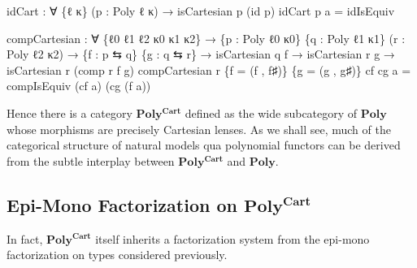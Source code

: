 \documentclass[
  11pt,
  oneside,
  article]{memoir}
\newenvironment{Shaded}{}{}
\newcommand{\NormalTok}[1]{#1}
\newcommand{\OtherTok}[1]{\textcolor[rgb]{0.00,0.44,0.13}{#1}}
\theoremstyle{definition}
\theoremstyle{plain}
\newcommand{\0}{\textsf{0}}
\newcommand{\1}{\tn{\textsf{1}}}
\begin{document}
\begin{Shaded}
\begin{Highlighting}[]
\NormalTok{idCart }\OtherTok{:} \OtherTok{∀} \OtherTok{\{}\NormalTok{ℓ κ}\OtherTok{\}} \OtherTok{(}\NormalTok{p }\OtherTok{:}\NormalTok{ Poly ℓ κ}\OtherTok{)}
         \OtherTok{→}\NormalTok{ isCartesian p }\OtherTok{(}\NormalTok{id p}\OtherTok{)}
\NormalTok{idCart p a }\OtherTok{=}\NormalTok{ idIsEquiv}

\NormalTok{compCartesian }\OtherTok{:} \OtherTok{∀} \OtherTok{\{}\NormalTok{ℓ0 ℓ1 ℓ2 κ0 κ1 κ2}\OtherTok{\}}
                \OtherTok{→} \OtherTok{\{}\NormalTok{p }\OtherTok{:}\NormalTok{ Poly ℓ0 κ0}\OtherTok{\}} \OtherTok{\{}\NormalTok{q }\OtherTok{:}\NormalTok{ Poly ℓ1 κ1}\OtherTok{\}} \OtherTok{(}\NormalTok{r }\OtherTok{:}\NormalTok{ Poly ℓ2 κ2}\OtherTok{)}
                \OtherTok{→} \OtherTok{\{}\NormalTok{f }\OtherTok{:}\NormalTok{ p ⇆ q}\OtherTok{\}} \OtherTok{\{}\NormalTok{g }\OtherTok{:}\NormalTok{ q ⇆ r}\OtherTok{\}}
                \OtherTok{→}\NormalTok{ isCartesian q f }\OtherTok{→}\NormalTok{ isCartesian r g }
                \OtherTok{→}\NormalTok{ isCartesian r }\OtherTok{(}\NormalTok{comp r f g}\OtherTok{)}
\NormalTok{compCartesian r }\OtherTok{\{}\NormalTok{f }\OtherTok{=} \OtherTok{(}\NormalTok{f , f♯}\OtherTok{)\}} \OtherTok{\{}\NormalTok{g }\OtherTok{=} \OtherTok{(}\NormalTok{g , g♯}\OtherTok{)\}}\NormalTok{ cf cg a }\OtherTok{=} 
\NormalTok{    compIsEquiv }\OtherTok{(}\NormalTok{cf a}\OtherTok{)} \OtherTok{(}\NormalTok{cg }\OtherTok{(}\NormalTok{f a}\OtherTok{))}
\end{Highlighting}
\end{Shaded}

Hence there is a category \(\mathbf{Poly^{Cart}}\) defined as the wide
subcategory of \(\mathbf{Poly}\) whose morphisms are precisely Cartesian
lenses. As we shall see, much of the categorical structure of natural
models qua polynomial functors can be derived from the subtle interplay
between \(\mathbf{Poly^{Cart}}\) and \(\mathbf{Poly}\).

\subsection{\texorpdfstring{Epi-Mono Factorization on
\(\mathbf{Poly^{Cart}}\)}{Epi-Mono Factorization on \textbackslash mathbf\{Poly\^{}\{Cart\}\}}}\label{epi-mono-factorization-on-mathbfpolycart}

In fact, \(\mathbf{Poly^{Cart}}\) itself inherits a factorization system
from the epi-mono factorization on types considered previously.
\end{document}
